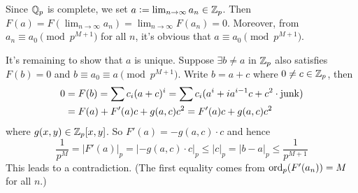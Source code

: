 \documentclass[../Koblitz.tex]{subfiles}
\begin{document}
Since $\mathbb{Q}_p$ is complete, we set $a:=\lim_{n\to\infty}a_n\in\mathbb{Z}_p$. Then $F(a)=F\left(\lim_{n\to\infty} a_n\right) = \lim_{n\to\infty} F(a_n) = 0$. Moreover, from $a_n\equiv a_0 \pmod{p^{M+1}}$ for all $n$, it's obvious that $a\equiv a_0 \pmod{p^{M+1}}$.

It's remaining to show that $a$ is unique. Suppose $\exists b\neq a$ in $\mathbb{Z}_p$ also satisfies $F(b)=0$ and $b\equiv a_0\equiv a\pmod{p^{M+1}}$. Write $b=a+c$ where $0\neq c\in\mathbb{Z}_p$, then
\begin{align*}
    0 &= F(b) = \sum c_i(a+c)^i = \sum c_i(a^i + ia^{i-1}c + c^2 \cdot\operatorname{junk}) \\
    &= F(a) + F'(a)c + g(a,c)c^2 = F'(a)c + g(a,c)c^2
\end{align*}
where $g(x,y)\in\mathbb{Z}_p[x,y]$. So $F'(a)=-g(a,c)\cdot c$ and hence $$\frac{1}{p^M} = \left|F'(a)\right|_p = |-g(a,c)\cdot c|_p \leq |c|_p = |b-a|_p \leq \frac{1}{p^{M+1}}$$ This leads to a contradiction. (The first equality comes from $\operatorname{ord}_p(F'(a_n))=M$ for all $n$.)
\end{document}
